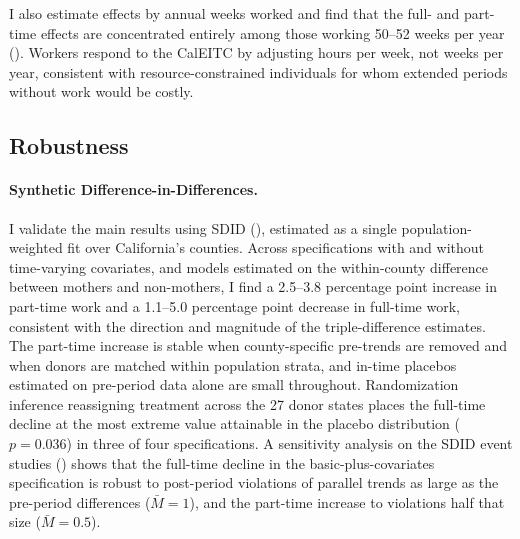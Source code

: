\documentclass[11pt]{article}
\let\Cref\crtCref
\begin{document}

I also estimate effects by annual weeks worked and find that the full- and part-time effects are concentrated entirely among those working 50--52 weeks per year (\Cref{fig:appA_weeks}). Workers respond to the CalEITC by adjusting hours per week, not weeks per year, consistent with resource-constrained individuals for whom extended periods without work would be costly.


\subsection{Robustness} \label{sec:robustness}


\paragraph{Synthetic Difference-in-Differences.} I validate the main results using SDID (\Cref{tab:sdid}), estimated as a single population-weighted fit over California's counties. Across specifications with and without time-varying covariates, and models estimated on the within-county difference between mothers and non-mothers, I find a 2.5--3.8 percentage point increase in part-time work and a 1.1--5.0 percentage point decrease in full-time work, consistent with the direction and magnitude of the triple-difference estimates. The part-time increase is stable when county-specific pre-trends are removed and when donors are matched within population strata, and in-time placebos estimated on pre-period data alone are small throughout. Randomization inference reassigning treatment across the 27 donor states places the full-time decline at the most extreme value attainable in the placebo distribution ($p = 0.036$) in three of four specifications. A \cite{rambachan_more_2023} sensitivity analysis on the SDID event studies (\Cref{tab:honestdid}) shows that the full-time decline in the basic-plus-covariates specification is robust to post-period violations of parallel trends as large as the pre-period differences ($\bar{M} = 1$), and the part-time increase to violations half that size ($\bar{M} = 0.5$).

\end{document}
